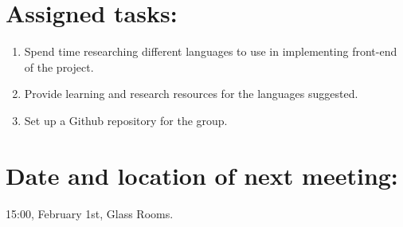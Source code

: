 \documentclass[a4paper, 12pt]{article}
\begin{document}
	\section{Assigned tasks:}
		\begin{enumerate}[label*=\arabic*.]
			\item Spend time researching different languages to use in implementing front-end of the project.
			\item Provide learning and research resources for the languages suggested.
			\item Set up a Github repository for the group.
		\end{enumerate}

	\section{Date and location of next meeting:}
		15:00, February 1st, Glass Rooms.
\end{document}
